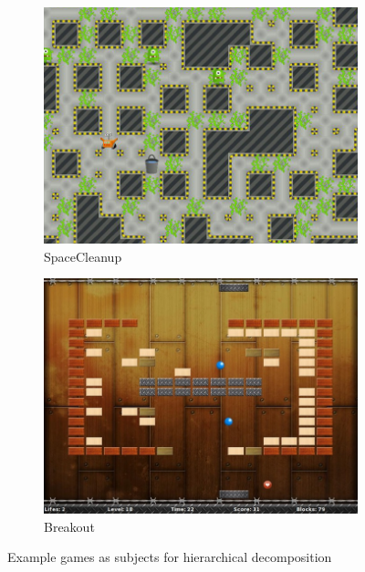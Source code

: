 \begin{figure}[!htp]
\centering
\begin{subfigure}[b]{0.45\textwidth}
    \includegraphics[width=\textwidth]{screen_scleanup.jpeg}
    \caption{SpaceCleanup}
\end{subfigure}
\qquad
\begin{subfigure}[b]{0.45\textwidth}
    \includegraphics[width=\textwidth]{screen_breakout.jpeg}
    \caption{Breakout}
\end{subfigure}
\caption{Example games as subjects for hierarchical decomposition}
\label{fig:usecase_games}
\end{figure}

